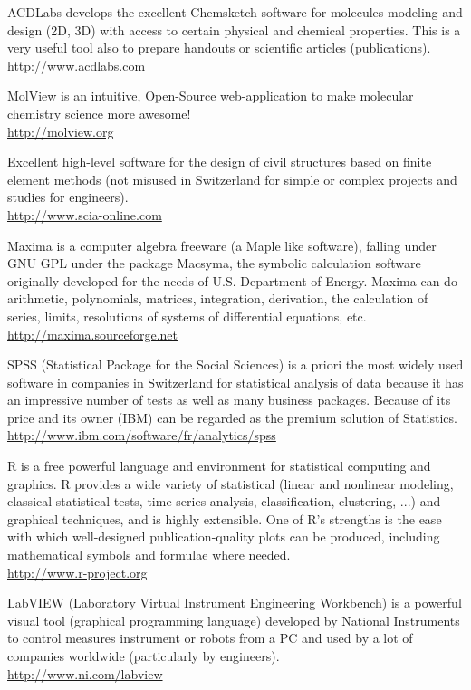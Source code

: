 	{\Large {}}{\Large {}} ACDLabs develops the excellent Chemsketch software for molecules modeling and design (2D, 3D) with access to certain physical and chemical properties. This is a very useful tool also to prepare handouts or scientific articles (publications).\\
	\href{http://www.acdlabs.com}{\color{blue}http://www.acdlabs.com}
	
	{\Large {}}{\Large {}}{\Large {}} MolView is an intuitive, Open-Source web-application to make molecular chemistry science more awesome!\\
	\href{http://molview.org}{\color{blue}http://molview.org}
	
	{\Large {}}{\Large {}} Excellent high-level software for the design of civil structures based on finite element methods (not misused in Switzerland for simple or complex projects and studies for engineers).\\
	\href{http://www.scia-online.com}{\color{blue}http://www.scia-online.com}
	
	{\Large {}}{\Large {}} Maxima is a computer algebra freeware (a Maple like software), falling under GNU GPL under the package Macsyma, the symbolic calculation software originally developed for the needs of U.S. Department of Energy. Maxima can do arithmetic, polynomials, matrices, integration, derivation, the calculation of series, limits, resolutions of systems of differential equations, etc.\\
	\href{http://maxima.sourceforge.net}{\color{blue}http://maxima.sourceforge.net}
	
	{\Large {}}{\Large {}} SPSS (Statistical Package for the Social Sciences) is a priori the most widely used software in companies in Switzerland for statistical analysis of data because it has an impressive number of tests as well as many business packages. Because of its price and its owner (IBM) can be regarded as the premium solution of Statistics.\\
	\href{http://www.ibm.com/software/fr/analytics/spss}{\color{blue}http://www.ibm.com/software/fr/analytics/spss}
	
	{\Large {}}{\Large {}}{\Large {}} R is a free powerful language and environment for statistical computing and graphics. R provides a wide variety of statistical (linear and nonlinear modeling, classical statistical tests, time-series analysis, classification, clustering, ...) and graphical techniques, and is highly extensible. One of R's strengths is the ease with which well-designed publication-quality plots can be produced, including mathematical symbols and formulae where needed.\\
	\href{http://www.r-project.org}{\color{blue}http://www.r-project.org}
	
	{\Large {}}{\Large {}} LabVIEW (Laboratory Virtual Instrument Engineering Workbench) is a powerful visual tool (graphical programming language) developed by National Instruments to control measures instrument or robots from a PC and used by a lot of companies worldwide (particularly by engineers).\\
	\href{http://www.ni.com/labview}{\color{blue}http://www.ni.com/labview}